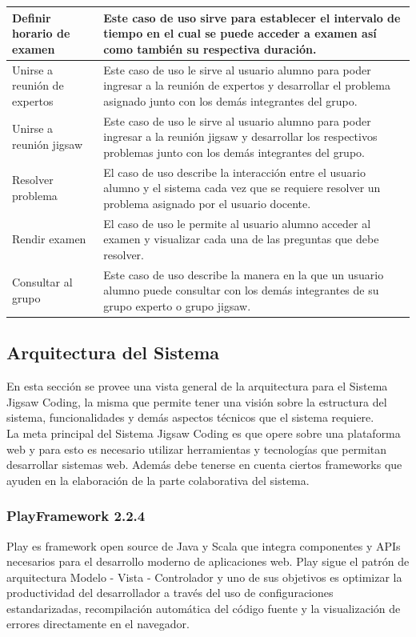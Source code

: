 \begin{longtable}{|L{4cm}|L{9cm}|}
	\hline
	Definir horario de examen & Este caso de uso sirve para establecer el intervalo de tiempo en el cual se puede acceder a examen así como también su respectiva duración.\\
	\hline
	Unirse a reunión de expertos & Este caso de uso le sirve al usuario alumno para poder ingresar a la reunión de expertos y desarrollar el problema asignado junto con los demás integrantes del grupo.\\
	\hline
	Unirse a reunión jigsaw & Este caso de uso le sirve al usuario alumno para poder ingresar a la reunión jigsaw y desarrollar los respectivos problemas junto con los demás integrantes del grupo. \\
	\hline
	Resolver problema & El caso de uso describe la interacción entre el usuario alumno y el sistema cada vez que se requiere resolver un problema asignado por el usuario docente.\\
	\hline
	Rendir examen & El caso de uso le permite al usuario alumno acceder al examen y visualizar cada una de las preguntas que debe resolver.\\
	\hline
	Consultar al grupo & Este caso de uso describe la manera en la que un usuario alumno puede consultar con los demás integrantes de su grupo experto o grupo jigsaw.\\
	\hline
\end{longtable}

\subsection{Arquitectura del Sistema}
En esta sección se provee una vista general de la arquitectura para el Sistema Jigsaw Coding, la misma que permite tener una visión sobre la estructura del sistema, funcionalidades y demás aspectos técnicos que el sistema requiere.\\

La meta principal del Sistema Jigsaw Coding es que opere sobre una plataforma web y para esto es necesario utilizar herramientas y tecnologías que permitan desarrollar sistemas web. Además debe tenerse en cuenta ciertos frameworks que ayuden en la elaboración de la parte colaborativa del sistema.\\

\subsubsection{PlayFramework 2.2.4}
Play es framework open source de Java y Scala que integra componentes y APIs necesarios para el desarrollo moderno de aplicaciones web. Play sigue el patrón de arquitectura Modelo - Vista - Controlador y uno de sus objetivos es optimizar la productividad del desarrollador a través del uso de configuraciones estandarizadas, recompilación automática del código fuente y la visualización de errores directamente en el navegador.\\

